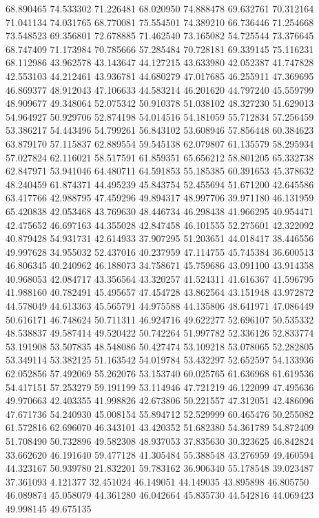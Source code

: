 68.890465
74.533302
71.226481
68.020950
74.888478
69.632761
70.312164
71.041134
74.031765
68.770081
75.554501
74.389210
66.736446
71.254668
73.548523
69.356801
72.678885
71.462540
73.165082
54.725544
73.376645
68.747409
71.173984
70.785666
57.285484
70.728181
69.339145
75.116231
68.112986
43.962578
43.143647
44.127215
43.633980
42.052387
41.747828
42.553103
44.212461
43.936781
44.680279
47.017685
46.255911
47.369695
46.869377
48.912043
47.106633
44.583214
46.201620
44.797240
45.559799
48.909677
49.348064
52.075342
50.910378
51.038102
48.327230
51.629013
54.964927
50.929706
52.874198
54.014516
54.181059
55.712834
57.256459
53.386217
54.443496
54.799261
56.843102
53.608946
57.856448
60.384623
63.879170
57.115837
62.889554
59.545138
62.079807
61.135579
58.295934
57.027824
62.116021
58.517591
61.859351
65.656212
58.801205
65.332738
62.847971
53.941046
64.480711
64.591853
55.185385
60.391653
45.378632
48.240459
61.874371
44.495239
45.843754
52.455694
51.671200
42.645586
63.417766
42.988795
47.459296
49.894317
48.997706
39.971180
46.131959
65.420838
42.053468
43.769630
48.446734
46.298438
41.966295
40.954471
42.475652
46.697163
44.355028
42.847458
46.101555
52.275601
42.322092
40.879428
54.931731
42.614933
37.907295
51.203651
44.018417
38.446556
49.997628
34.955032
52.437016
40.237959
47.114755
45.745384
36.600513
46.806345
40.240962
46.188073
34.758671
45.759686
43.091100
43.914358
40.968053
42.084717
43.356564
43.320257
41.524311
41.616367
41.596795
41.988160
40.782491
45.495657
47.454728
43.862564
43.151948
43.972872
44.578049
44.613363
45.565791
44.975588
44.135806
48.641971
47.086449
50.616171
46.748624
50.711311
46.924716
49.622277
52.696107
50.535332
48.538837
49.587414
49.520422
50.742264
51.997782
52.336126
52.833774
53.191908
53.507835
48.548086
50.427474
53.109218
53.078065
52.282805
53.349114
53.382125
51.163542
54.019784
53.432297
52.652597
54.133936
62.052856
57.492069
55.262076
53.153740
60.025765
61.636968
61.619536
54.417151
57.253279
59.191199
53.114946
47.721219
46.122099
47.495636
49.970663
42.403355
41.998826
42.673806
50.221557
47.312051
42.486096
47.671736
54.240930
45.008154
55.894712
52.529999
60.465476
50.255082
61.572816
62.696070
46.343101
43.420352
51.682380
54.361789
54.872409
51.708490
50.732896
49.582308
48.937053
37.835630
30.323625
46.842824
33.662620
46.191640
59.477128
41.305484
55.388548
43.276959
49.460594
44.323167
50.939780
21.832201
59.783162
36.906340
55.178548
39.023487
37.361093
4.121377
32.451024
46.149051
44.149035
43.895898
46.805750
46.089874
45.058079
44.361280
46.042664
45.835730
44.542816
44.069423
49.998145
49.675135
